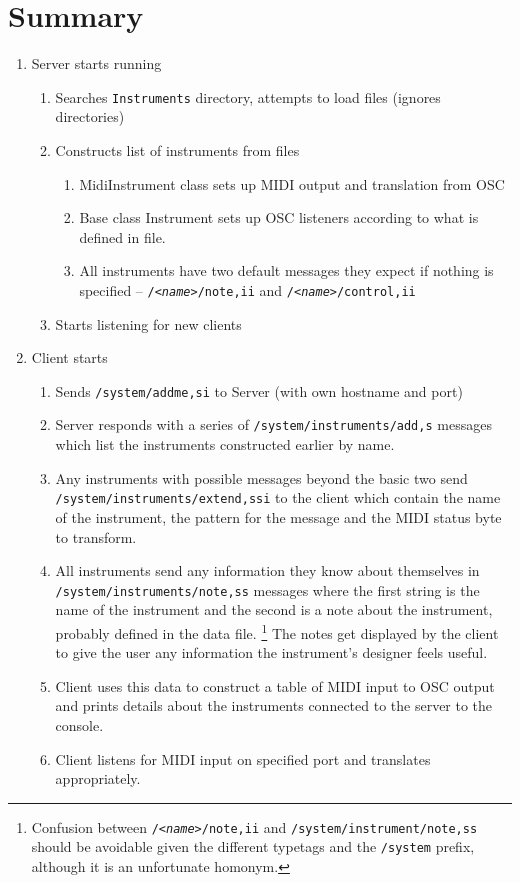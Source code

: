 \documentclass[../main.tex]{subfiles}
\begin{document}
\raggedright
\section*{Summary}
\begin{enumerate}[\bf1.]
	\item Server starts running
	\begin{enumerate} [\bf a.]                          
		\item Searches \texttt{Instruments} directory, attempts to load files (ignores directories)
		\item Constructs list of instruments from files
		\begin{enumerate}
			\item MidiInstrument class sets up MIDI output and translation from OSC
			\item Base class Instrument sets up OSC listeners according to what is defined in file.
			\item All instruments have two default messages they expect if nothing is specified -- \texttt{/\textit{<name>}/note,ii} and 
				 \texttt{/\textit{<name>}/control,ii} 
		\end{enumerate}
		\item Starts listening for new clients
	 \end{enumerate}
	 \item Client starts 
	 \begin{enumerate} [\bf a.]
	 	\item Sends \texttt{/system/addme,si} to Server (with own hostname and port)
		\item Server responds with a series of \texttt{/system/instruments/add,s} messages which list the instruments constructed earlier by name.
		\item Any instruments with possible messages beyond the basic two send
			 \texttt{/system/instruments/extend,ssi} to the client
			which contain the name of the instrument, the pattern for the message and the MIDI status byte to transform.
		\item All instruments send any information they know about themselves in \texttt{/system/instruments/note,ss} messages where the first 
			string is the name of the instrument and the second is a note about the instrument, probably defined in the data file. \footnote{Confusion
			between \texttt{/\textit{<name>}/note,ii} and \texttt{/system/instrument/note,ss} should be avoidable given the different typetags and the 
			\texttt{/system} prefix, although it is an unfortunate homonym.} The notes get displayed by the client to give the user any information
			the instrument's designer feels useful.
		\item Client uses this data to construct a table of MIDI input to OSC output and prints details about the instruments connected to the server
			to the console.
		\item Client listens for MIDI input on specified port and translates appropriately.
	 \end{enumerate}
\end{enumerate}
\end{document}
